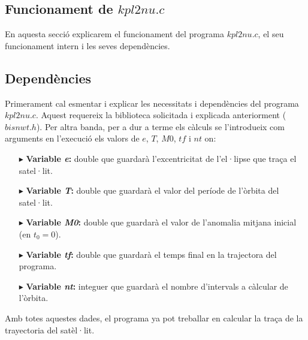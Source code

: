 \documentclass[12pt]{article}
\begin{document}
\subsection{Funcionament de $kpl2nu.c$}
En aquesta secció explicarem el funcionament del programa $kpl2nu.c$, el seu funcionament intern i les seves dependències.
\subsection{Dependències}
Primerament cal esmentar i explicar les necessitats i dependències del programa $kpl2nu.c$.
\newline
Aquest requereix la biblioteca solicitada i explicada anteriorment ($bisnwt.h$). Per altra banda, per a dur a terme els càlculs se l'introdueix com arguments en l'execució els valors de $e$, $T$, $M0$, $tf$ i $nt$ on:
\begin{itemize}
\item [$\blacktriangleright$] \textbf{Variable \textit{e}:} double que guardarà l'excentricitat de l'el·lipse que traça el satel·lit.
\item [$\blacktriangleright$] \textbf{Variable \textit{T}:} double que guardarà el valor del període de l'òrbita del satel·lit.
\item [$\blacktriangleright$] \textbf{Variable \textit{M0}:} double que guardarà el valor de l'anomalia mitjana inicial (en $t_0=0$).
\item [$\blacktriangleright$] \textbf{Variable \textit{tf}:} double que guardarà el temps final en la trajectora del programa.
\item [$\blacktriangleright$] \textbf{Variable \textit{nt}:} integuer que guardarà el nombre d'intervals a càlcular de l'òrbita.
\end{itemize}
Amb totes aquestes dades, el programa ya pot treballar en calcular la traça de la trayectoria del satèl·lit.
\newpage
\end{document}
